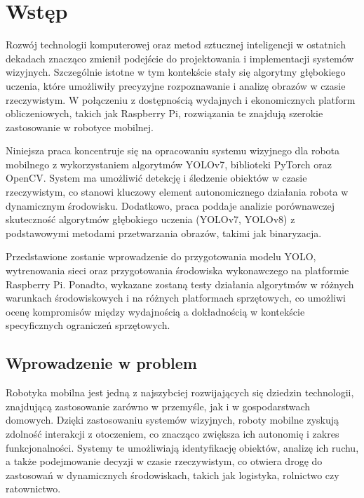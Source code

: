 \documentclass[a4paper,twoside,12pt]{book}
\newcounter{stronyPozaNumeracja}
\begin{document}
\tableofcontents

\setcounter{stronyPozaNumeracja}{\value{page}}
\mainmatter
\pagestyle{empty}

\cleardoublepage

\pagestyle{NumeryStronNazwyRozdzialow}


\chapter{Wstęp}
\label{ch:wstep}

Rozwój technologii komputerowej oraz metod sztucznej inteligencji w ostatnich dekadach znacząco zmienił podejście do projektowania i implementacji systemów wizyjnych. Szczególnie istotne w tym kontekście stały się algorytmy głębokiego uczenia, które umożliwiły precyzyjne rozpoznawanie i analizę obrazów w czasie rzeczywistym. W połączeniu z dostępnością wydajnych i ekonomicznych platform obliczeniowych, takich jak Raspberry Pi, rozwiązania te znajdują szerokie zastosowanie w robotyce mobilnej. 

Niniejsza praca koncentruje się na opracowaniu systemu wizyjnego dla robota mobilnego z wykorzystaniem algorytmów YOLOv7, biblioteki PyTorch oraz OpenCV. System ma umożliwić detekcję i śledzenie obiektów w czasie rzeczywistym, co stanowi kluczowy element autonomicznego działania robota w dynamicznym środowisku. Dodatkowo, praca poddaje analizie porównawczej skuteczność algorytmów głębokiego uczenia (YOLOv7, YOLOv8) z podstawowymi metodami przetwarzania obrazów, takimi jak binaryzacja. 

Przedstawione zostanie wprowadzenie do przygotowania modelu YOLO, wytrenowania sieci oraz przygotowania środowiska wykonawczego na platformie Raspberry Pi. Ponadto, wykazane zostaną testy działania algorytmów w różnych warunkach środowiskowych i na różnych platformach sprzętowych, co umożliwi ocenę kompromisów między wydajnością a dokładnością w kontekście specyficznych ograniczeń sprzętowych.

\newpage

\section{Wprowadzenie w problem}
Robotyka mobilna jest jedną z najszybciej rozwijających się dziedzin technologii, znajdującą zastosowanie zarówno w przemyśle, jak i w gospodarstwach domowych. Dzięki zastosowaniu systemów wizyjnych, roboty mobilne zyskują zdolność interakcji z otoczeniem, co znacząco zwiększa ich autonomię i zakres funkcjonalności. Systemy te umożliwiają identyfikację obiektów, analizę ich ruchu, a także podejmowanie decyzji w czasie rzeczywistym, co otwiera drogę do zastosowań w dynamicznych środowiskach, takich jak logistyka, rolnictwo czy ratownictwo.
\end{document}
